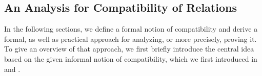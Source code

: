 


\subsection{An Analysis for Compatibility of Relations}

In the following sections, we define a formal notion of compatibility and derive a formal, as well as practical approach for analyzing, or more precisely, proving it.
To give an overview of that approach, we first briefly introduce the central idea based on the given informal notion of compatibility, which we first introduced in  and .

